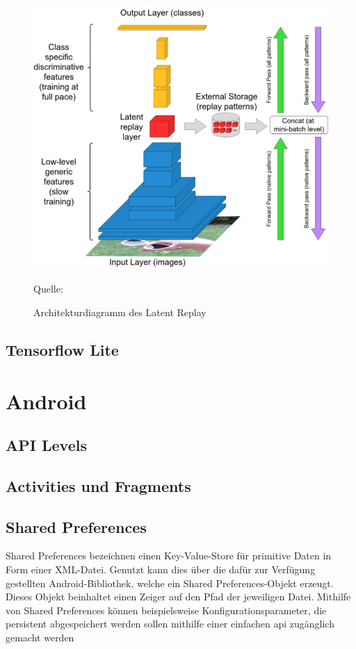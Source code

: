 \documentclass[oneside]{ausarbeitung}
\begin{document}
\begin{figure}[htbp]
  \centering
  \includegraphics[height=0.5\textheight]{images/latent-replay.png}
  \caption{Architekturdiagramm des Latent Replay} Quelle: \cite{Pellegrini2019}
  \label{fig:latent-replay}
\end{figure}
\subsection{Tensorflow Lite}
\section{Android}
\subsection{API Levels}
\subsection{Activities und Fragments}
\subsection{Shared Preferences}
Shared Preferences bezeichnen einen Key-Value-Store für primitive Daten in Form einer XML-Datei. Genutzt kann dies über die dafür zur Verfügung gestellten Android-Bibliothek, welche ein Shared Preferences-Objekt erzeugt. Dieses Objekt beinhaltet einen Zeiger auf den Pfad der jeweiligen Datei. Mithilfe von Shared Preferences können beispielsweise Konfigurationsparameter, die persistent abgespeichert werden sollen mithilfe einer einfachen \ac{api} zugänglich gemacht werden
\end{document}
